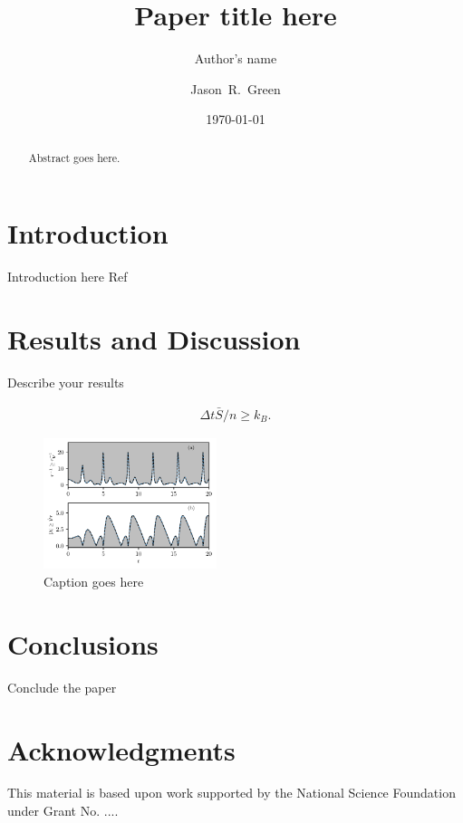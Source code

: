 \documentclass[prl,aps,reprint,noshowpacs,superscriptaddress,floatfix,letterpaper,longbibliography]{revtex4-2}
\begin{document}
	
	\title{Paper title here} 
	
	\author{Author's name}
	\author{Jason~R.~Green}
	\date{\today}
	
\begin{abstract}	
	Abstract goes here.
	\lipsum[1-1]
\end{abstract}

\maketitle

\section{Introduction}
Introduction here Ref~\cite{Nicholson2020}

\lipsum[2-3]

\section{Results and Discussion}
Describe your results

\begin{align}
\Delta t \bar S/n\geq k_B.
\end{align}

\lipsum[2-3]
\begin{figure}[h!]
	\centering
	\hspace*{-0.75cm}\includegraphics[width=0.45\textwidth]{sample-plot.pdf}
	\caption{Caption goes here}
	\label{fig:plot-label}
\end{figure}


\section{Conclusions}

Conclude the paper

\lipsum[2-3]

\section{Acknowledgments}
\begin{acknowledgments}
This material is based upon work supported by the National Science Foundation under Grant No. ....

\end{acknowledgments}
\appendix


\end{document}
